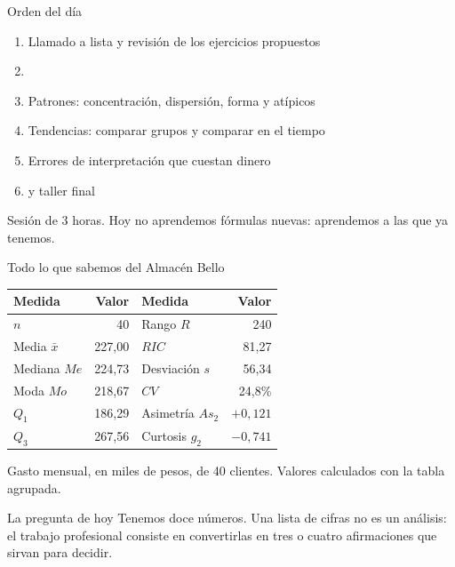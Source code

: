 \documentclass[aspectratio=169,10pt]{beamer}
\begin{document}
\portada

\begin{frame}{Orden del día}
  \begin{enumerate}
    \item Llamado a lista y revisión de los ejercicios propuestos
    \item {}
    \item Patrones: concentración, dispersión, forma y atípicos
    \item Tendencias: comparar grupos y comparar en el tiempo
    \item Errores de interpretación que cuestan dinero
    \item {} y taller final
  \end{enumerate}

  \vspace{0.25cm}
  {\footnotesize\color{uniGris} Sesión de 3 horas. Hoy no aprendemos fórmulas
  nuevas: aprendemos a  las que ya tenemos.}
\end{frame}

\begin{frame}{Todo lo que sabemos del Almacén Bello}
  \scriptsize
  \begin{center}
  \begin{tabular}{@{}lrlr@{}}
    \toprule
    \textbf{Medida} & \textbf{Valor} & \textbf{Medida} & \textbf{Valor} \\
    \midrule
    $n$ & 40 & Rango $R$ & 240 \\
    Media $\bar{x}$ & 227{,}00 & $RIC$ & 81{,}27 \\
    Mediana $Me$ & 224{,}73 & Desviación $s$ & 56{,}34 \\
    Moda $Mo$ & 218{,}67 & $CV$ & 24{,}8\% \\
    $Q_1$ & 186{,}29 & Asimetría $As_2$ & $+0{,}121$ \\
    $Q_3$ & 267{,}56 & Curtosis $g_2$ & $-0{,}741$ \\
    \bottomrule
  \end{tabular}
  \end{center}
  {\tiny\color{uniGris} Gasto mensual, en miles de pesos, de 40 clientes.
  Valores calculados con la tabla agrupada.}

  \vspace{0.1cm}
  \begin{alertblock}{La pregunta de hoy}
    \scriptsize
    Tenemos doce números.  Una lista de
    cifras no es un análisis: el trabajo profesional consiste en convertirlas
    en tres o cuatro afirmaciones que sirvan para decidir.
  \end{alertblock}
\end{frame}
\end{document}
